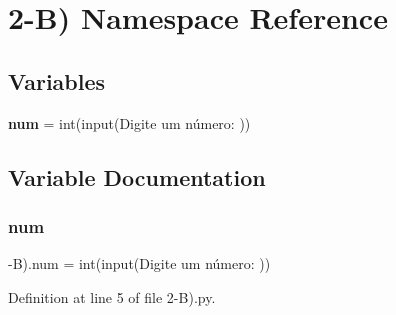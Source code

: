 \section{2-\/B) Namespace Reference}
\label{namespace2-_b_08}
\subsection*{Variables}
\begin{DoxyCompactItemize}
\item 
\textbf{ num} = int(input(\textquotesingle{}Digite um número\+: \textquotesingle{}))
\end{DoxyCompactItemize}


\subsection{Variable Documentation}
\mbox{\label{namespace2-_b_08_a91290438f6f27ec79ac9c39834d3e97d}} 
\subsubsection{num}
{\footnotesize{}-\/B).num = int(input(\textquotesingle{}Digite um número\+: \textquotesingle{}))}



Definition at line 5 of file 2-\/\+B).\+py.

